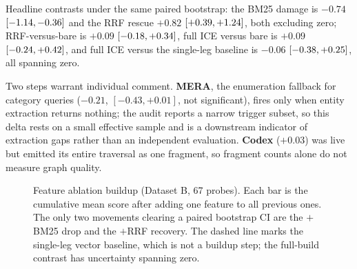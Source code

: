 \documentclass[11pt,a4paper]{article}
\begin{document}
Headline contrasts under the same paired bootstrap: the BM25 damage is $-0.74$ $[-1.14,-0.36]$ and the RRF rescue $+0.82$ $[+0.39,+1.24]$, both excluding zero; RRF-versus-bare is $+0.09$ $[-0.18,+0.34]$, full ICE versus bare is $+0.09$ $[-0.24,+0.42]$, and full ICE versus the single-leg baseline is $-0.06$ $[-0.38,+0.25]$, all spanning zero.

Two steps warrant individual comment. \textbf{MERA}, the enumeration fallback for category queries ($-0.21$, $[-0.43,+0.01]$, not significant), fires only when entity extraction returns nothing; the audit reports a narrow trigger subset, so this delta rests on a small effective sample and is a downstream indicator of extraction gaps rather than an independent evaluation. \textbf{Codex} ($+0.03$) was live but emitted its entire traversal as one fragment, so fragment counts alone do not measure graph quality.

\begin{figure}[htbp]
\centering
{}
\caption{Feature ablation buildup (Dataset B, 67 probes). Each bar is the cumulative mean score after adding one feature to all previous ones. The only two movements clearing a paired bootstrap CI are the $+$BM25 drop and the $+$RRF recovery. The dashed line marks the single-leg vector baseline, which is not a buildup step; the full-build contrast has uncertainty spanning zero.}
\label{fig:ablation-waterfall}
\end{figure}
\end{document}
